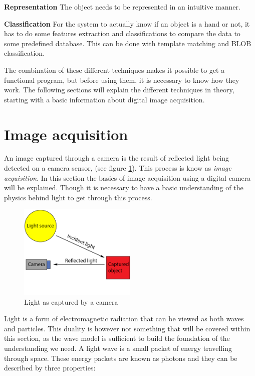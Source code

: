 \textbf{Representation}
The object needs to be represented in an intuitive manner.

\textbf{Classification}
For the system to actually know if an object is a hand or not, it has to do some features extraction and classifications to compare the data to some predefined database. This can be done with template matching and BLOB classification.


The combination of these different techniques makes it possible to get a functional program, but before using them, it is necessary to know how they work. The following sections will explain the different techniques in theory, starting with a basic information about digital image acquisition.

\section{Image acquisition}

An image captured through a camera is the result of reflected light being detected on a camera sensor, (see figure \ref{fig:light_cam}). This process is know as \textit{image acquisition}. In this section the basics of image acquisition using a digital camera will be explained. Though it is necessary to have a basic understanding of the physics behind light to get through this process.

\begin{figure}[htbp] 
\centering 
\includegraphics[width=0.5\textwidth]{Pictures/Theory/light_from_sun.png} 
\caption{Light as captured by a camera} 
\label{fig:light_cam} 
\end{figure}

Light is a form of electromagnetic radiation that can be viewed as both waves and particles. This duality is however not something that will be covered within this section, as the wave model is sufficient to build the foundation of the understanding we need. A light wave is a small packet of energy travelling through space. These energy packets are known as photons and they can be described by three properties:

